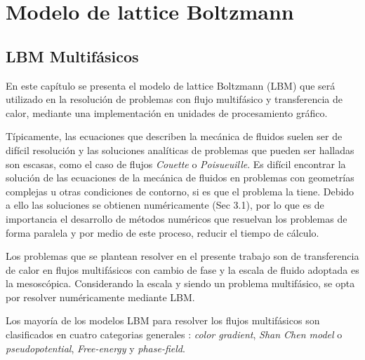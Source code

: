 \chapter{Modelo de lattice Boltzmann}

\graphicspath{{figs/cap2/}}
\label{cap2}

\section{LBM Multifásicos}

En este capítulo se presenta el modelo de lattice Boltzmann (LBM) que será utilizado en la resolución de problemas con flujo multifásico y transferencia de calor, mediante una implementación en unidades de procesamiento gráfico.

Típicamente, las ecuaciones que describen la mecánica de fluidos suelen ser de difícil resolución y las soluciones analíticas de problemas que pueden ser halladas son escasas, como el caso de flujos \textit{Couette} o \textit{Poisueuille}. Es difícil encontrar la solución de las ecuaciones de la mecánica de fluidos en problemas con geometrías complejas u otras condiciones de contorno, si es que el problema la tiene. Debido a ello las soluciones se obtienen numéricamente \cite{kruger2017lattice}(Sec 3.1), por lo que es de importancia el desarrollo de métodos numéricos que resuelvan los problemas de forma paralela y por medio de este proceso, reducir el tiempo de cálculo.

Los problemas que se plantean resolver en el presente trabajo son de transferencia de calor en flujos multifásicos con cambio de fase y la escala de fluido adoptada es la mesoscópica. Considerando la escala y siendo un problema multifásico, se opta por resolver numéricamente mediante LBM. 


Los mayoría de los modelos LBM para resolver los flujos multifásicos son clasificados en cuatro categorias generales : \textit{color gradient}, \textit{Shan Chen model} o \textit{pseudopotential}, \textit{Free-energy} y  \textit{phase-field}. 


